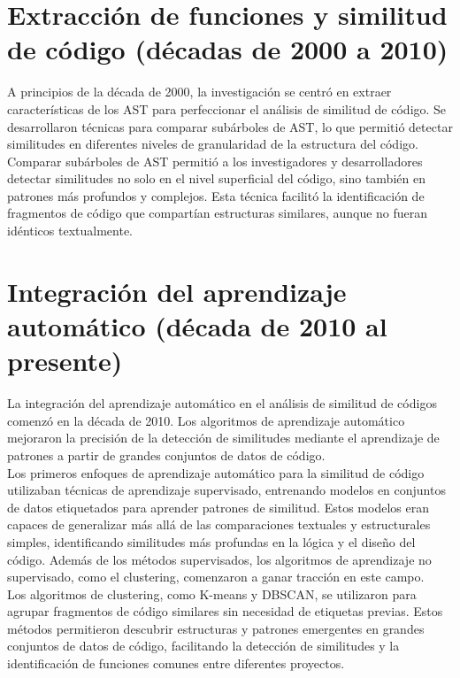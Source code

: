\section*{\textbf{Extracción de funciones y similitud de código (décadas de 2000 a 2010)}}
A principios de la década de 2000, la investigación se centró en extraer características de los AST para perfeccionar el análisis de similitud de código. Se desarrollaron técnicas para comparar subárboles de AST, lo que permitió detectar similitudes en diferentes niveles de granularidad de la estructura del código. \\

Comparar subárboles de AST permitió a los investigadores y desarrolladores detectar similitudes no solo en el nivel superficial del código, sino también en patrones más profundos y complejos. Esta técnica facilitó la identificación de fragmentos de código que compartían estructuras similares, aunque no fueran idénticos textualmente. \\

\section*{\textbf{Integración del aprendizaje automático (década de 2010 al presente)}}
La integración del aprendizaje automático en el análisis de similitud de códigos comenzó en la década de 2010. Los algoritmos de aprendizaje automático mejoraron la precisión de la detección de similitudes mediante el aprendizaje de patrones a partir de grandes conjuntos de datos de código. \\

Los primeros enfoques de aprendizaje automático para la similitud de código utilizaban técnicas de aprendizaje supervisado, entrenando modelos en conjuntos de datos etiquetados para aprender patrones de similitud. Estos modelos eran capaces de generalizar más allá de las comparaciones textuales y estructurales simples, identificando similitudes más profundas en la lógica y el diseño del código. Además de los métodos supervisados, los algoritmos de aprendizaje no supervisado, como el clustering, comenzaron a ganar tracción en este campo. \\

Los algoritmos de clustering, como K-means y DBSCAN, se utilizaron para agrupar fragmentos de código similares sin necesidad de etiquetas previas. Estos métodos permitieron descubrir estructuras y patrones emergentes en grandes conjuntos de datos de código, facilitando la detección de similitudes y la identificación de funciones comunes entre diferentes proyectos. \\

